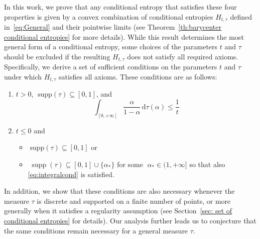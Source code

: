 \documentclass[aps,pra,11pt,onecolumn,nofootinbib,tightenlines]{revtex4-2}
\theoremstyle{definition}
\renewcommand{\H}{\mathbb{H}}
\begin{document}


In this work, we prove that any conditional entropy that satisfies these four properties is given by a convex combination of conditional entropies $H_{t,\tau}$ defined in~\eqref{eq:General} and their pointwise limits (see Theorem~\ref{th:barycenter conditional entropies} for more details). 
While this result determines the most general form of a conditional entropy, some choices of the parameters \(t\) and \(\tau\) should be excluded if the resulting \(H_{t,\tau}\) does not satisfy all required axioms.
Specifically, we derive a set of sufficient conditions on the parameters $t$ and $\tau$ under which $H_{t,\tau}$ satisfies all axioms. 
These conditions are as follows:
\begin{enumerate}
    \item $t> 0$, $\;\text{supp}(\tau) \subseteq [0,1]$, and
    \begin{equation}\label{eq:integralcond}
    \int_{[0,+\infty]}\frac{\alpha}{1-\alpha}\,\mathrm{d}\tau(\alpha)\leq \frac{1}{t}
    \end{equation}
    \item $t \leq 0$ and
    \begin{itemize}
    \item[(a)] $\;\text{supp}(\tau) \subseteq [0,1]$ or
    \item[(b)] $\;\operatorname{supp}(\tau) \subseteq [0,1] \cup \{\alpha_*\}$ for some $\;\alpha_* \in (1, +\infty]$ so that also \eqref{eq:integralcond} is satisfied.
    \end{itemize}
\end{enumerate}
In addition, we show that these conditions are also necessary whenever the measure \(\tau\) is discrete and supported on a finite number of points, or more generally when it satisfies a regularity assumption (see Section~\ref{sec: set of conditional entropies} for details).
Our analysis further leads us to conjecture that the same conditions remain necessary for a general measure $\tau$. 
\end{document}
